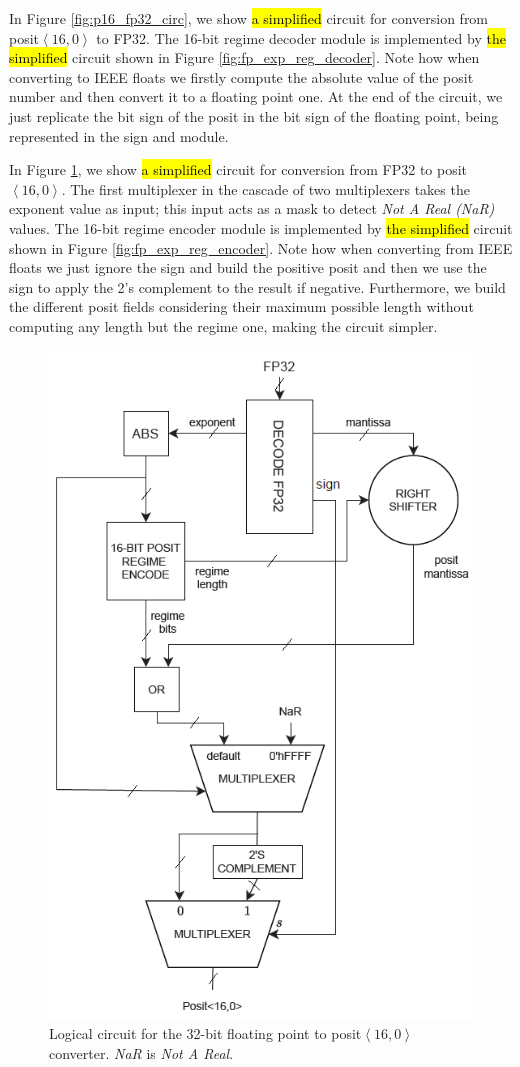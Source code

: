 In Figure \ref{fig:p16_fp32_circ}, we show \hl{a simplified} circuit for conversion from posit$\left<16,0\right>$ to FP32. The 16-bit regime decoder module is implemented by \hl{the simplified} circuit shown in Figure \ref{fig:fp_exp_reg_decoder}. Note how when converting to IEEE floats we firstly compute the absolute value of the posit number and then convert it to a floating point one. At the end of the circuit, we just replicate the bit sign of the posit in the bit sign of the floating point, being represented in the sign and module. 


In Figure \ref{fig:fp32_p16_circ}, we show \hl{a simplified} circuit for conversion from FP32 to posit$\left<16,0\right>$. The first multiplexer in the cascade of two multiplexers takes the exponent value as input; this input acts as a mask to detect \textit{Not A Real (NaR)} values. The 16-bit regime encoder module is implemented by \hl{the simplified} circuit shown in Figure \ref{fig:fp_exp_reg_encoder}. Note how when converting from IEEE floats we just ignore the sign and build the positive posit and then we use the sign to apply the 2's complement to the result if negative. Furthermore, we build the different posit fields considering their maximum possible length without computing any length but the regime one, making the circuit simpler.

\begin{figure}
    \centering
    \includegraphics[width=0.5\linewidth]{img/fp32_p16.PNG}
    \caption{Logical circuit for the 32-bit floating point to posit$\left<16,0\right>$ converter. \textit{NaR} is \textit{Not A Real}.}
    \label{fig:fp32_p16_circ}
\end{figure}

